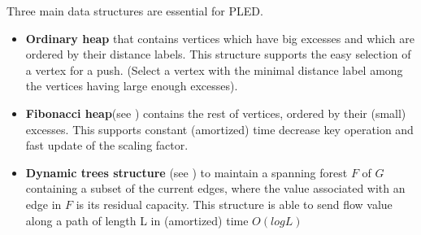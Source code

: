 Three main data structures are essential for PLED. 
\begin{itemize}
\item {\bf Ordinary heap} that contains vertices which have big
excesses and which are ordered by their distance labels. This
structure supports the easy selection of a vertex for a push.
(Select a vertex with the minimal distance label 
among the vertices having large enough excesses). 

\item {\bf Fibonacci heap}(see \cite{FH}) contains the rest of
vertices, ordered by their (small) excesses. This supports constant
(amortized) time decrease key operation and fast update of the
scaling factor. 

\item {\bf Dynamic trees structure} (see \cite{ST}) to maintain a
spanning forest $F$ of $G$ containing a subset of the current edges,
where the value associated with an edge in $F$ is its residual
capacity. This structure is able to send flow value along a path of
length L in (amortized) time $O(logL)$\\
\end{itemize}

